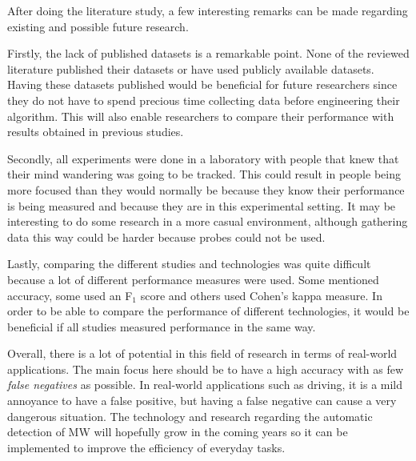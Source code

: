 After doing the literature study, a few interesting remarks can be made regarding existing and possible future research. 

Firstly, the lack of published datasets is a remarkable point. None of the reviewed literature published their datasets or have used publicly available datasets. Having these datasets published would be beneficial for future researchers since they do not have to spend precious time collecting data before engineering their algorithm. This will also enable researchers to compare their performance with results obtained in previous studies.

Secondly, all experiments were done in a laboratory with people that knew that their mind wandering was going to be tracked. This could result in people being more focused than they would normally be because they know their performance is being measured and because they are in this experimental setting. It may be interesting to do some research in a more casual environment, although gathering data this way could be harder because probes could not be used.

Lastly, comparing the different studies and technologies was quite difficult because a lot of different performance measures were used. Some mentioned accuracy, some used an F$_1$ score and others used Cohen's kappa measure. In order to be able to compare the performance of different technologies, it would be beneficial if all studies measured performance in the same way. 

Overall, there is a lot of potential in this field of research in terms of real-world applications. The main focus here should be to have a high accuracy with as few \emph{false negatives} as possible. In real-world applications such as driving, it is a mild annoyance to have a false positive, but having a false negative can cause a very dangerous situation. The technology and research regarding the automatic detection of MW will hopefully grow in the coming years so it can be implemented to improve the efficiency of everyday tasks.